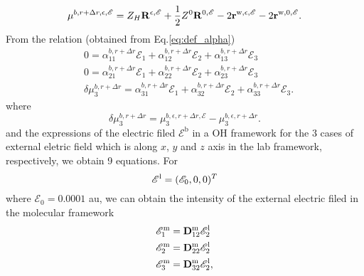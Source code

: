 \begin{equation}
  \mu^{b,r+\Delta r,\epsilon,\mathscr{E}} = Z_H{\bf R}^{\epsilon,\mathscr{E}} + 
  \frac{1}{2}Z^0 {\bf R}^{0,\mathscr{E}} -2 {\bf r}^{\text{w},\epsilon,\mathscr{E}} -2{\bf r}^{\text{w},0,\mathscr{E}}.
\end{equation}
From the relation (obtained from Eq.\space\ref{eq:def_alpha})
      \begin{subequations}
          \begin{align}
            & 0 = \alpha^{b,r+\Delta r}_{11}\mathscr{E}_{1} + \alpha^{b,r+\Delta r}_{12}\mathscr{E}_{2} + \alpha^{b,r+\Delta r}_{13}\mathscr{E}_{3}\\
            & 0 = \alpha^{b,r+\Delta r}_{21}\mathscr{E}_{1} + \alpha^{b,r+\Delta r}_{22}\mathscr{E}_{2} + \alpha^{b,r+\Delta r}_{23}\mathscr{E}_{3}\\
            & \delta \mu^{b,r+\Delta r}_{3} = \alpha^{b,r+\Delta r}_{31}\mathscr{E}_{1} + \alpha^{b,r+\Delta r}_{32}\mathscr{E}_{2} + \alpha^{b,r+\Delta r}_{33}\mathscr{E}_{3}.
          \end{align}
      \end{subequations}
%
where
\begin{equation}
  \delta \mu^{b,r+\Delta r}_{3} = \mu^{b,\epsilon,r+\Delta r,\mathscr{E}}_{3} - \mu^{b,\epsilon,r+\Delta r}_{3}.
\end{equation}
%
and the expressions of the electric filed ${\mathscr{E}^\text{b}}$ in a OH framework for the 3 cases of external eletric field 
which is along $x$, $y$ and $z$ axis in the lab framework, respectively, we obtain 9 equations.
%
For
\begin{equation}
  {\bf\mathscr{E}}^{\text{l}} = (\mathscr{E}_0, 0,0)^T \nonumber
\end{equation}  
where $\mathscr{E}_0 = 0.0001$ au, we can obtain the intensity of the external electric filed in the molecular framework  
\begin{subequations}
  \begin{align}
    &\mathscr{E}^\text{m}_1 = {\bf D}^{\text{m}}_{12} \mathscr{E}^\text{l}_2\\
    &\mathscr{E}^\text{m}_2 = {\bf D}^{\text{m}}_{22} \mathscr{E}^\text{l}_2\\
    &\mathscr{E}^\text{m}_3 = {\bf D}^{\text{m}}_{32} \mathscr{E}^\text{l}_2,
    \end{align}
\end{subequations}
